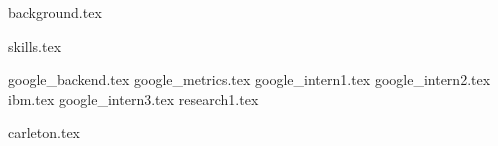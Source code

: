 \documentclass[11pt]{article}
\begin{document}
{background.tex}

\vspace{1mm}
{skills.tex}


{google_backend.tex}
\vspace{1mm}
{google_metrics.tex}
\vspace{1mm}
{google_intern1.tex}
\vspace{1mm}
{google_intern2.tex}
\vspace{1mm}
{ibm.tex}
\vspace{1mm}
{google_intern3.tex}
\vspace{1mm}
{research1.tex}


{carleton.tex}


\end{document}

